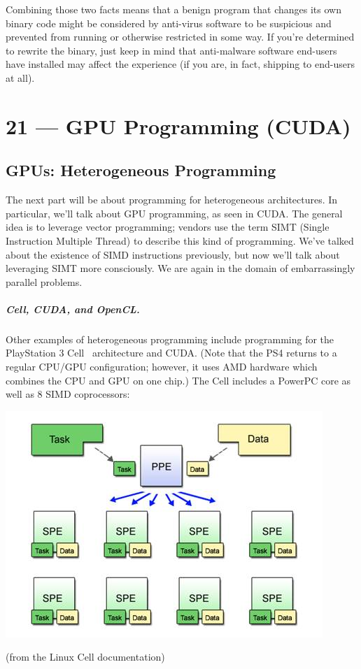\documentclass[a4paper]{report}
\begin{document}
Combining those two facts means that a benign program that changes its own binary code might be considered by anti-virus software to be suspicious and prevented from running or otherwise restricted in some way. If you're determined to rewrite the binary, just keep in mind that anti-malware software end-users have installed may affect the experience (if you are, in fact, shipping to end-users at all).








\chapter*{21 --- GPU Programming (CUDA)}


\section*{GPUs: Heterogeneous Programming}

The next part will be about programming for heterogeneous
architectures. In particular, we'll talk about GPU programming, as
seen in CUDA. The general idea is to
leverage vector programming; vendors use the term SIMT (Single
Instruction Multiple Thread) to describe this kind of
programming. We've talked about the existence of SIMD instructions
previously, but now we'll talk about leveraging SIMT more
consciously. We are again in the domain of embarrassingly parallel
problems.

\paragraph{Cell, CUDA, and OpenCL.} 
Other examples of heterogeneous programming include
programming for the PlayStation 3 Cell~\cite{cellprimer} architecture and CUDA. (Note that the PS4 returns to a regular CPU/GPU configuration; however, it uses AMD hardware which combines the CPU and GPU on one chip.) The Cell includes a PowerPC core as well as
8 SIMD coprocessors:

\begin{center}
\includegraphics[width=.4\textwidth]{images/cell.jpg}
\end{center}
\hfill (from the Linux Cell documentation)
\end{document}
